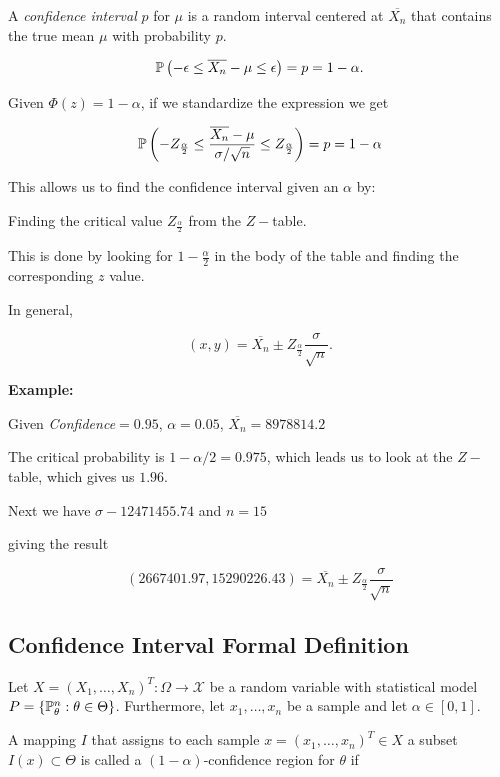 A \emph{confidence interval} \(p\) for \(\mu\) is a random interval centered at \(\overline{X_n}\) 
that contains the true mean \(\mu\) with probability \(p\). 

\[
    \mathbb{P}\left(- \epsilon \le  \overline{X_n} - \mu \le \epsilon\right) = p = 1 - \alpha.
\]

Given \(\Phi(z) = 1 - \alpha\), if we standardize the expression we get 

\[
    \mathbb{P}\left(- Z_{\frac{\alpha}{2}} \le  \frac{\overline{X_n} - \mu}{\sigma / \sqrt{n}} \le Z_{\frac{\alpha}{2}}\right) = p = 1 - \alpha
\]

This allows us to find the confidence interval given an \(\alpha\) by: 

Finding the critical value \(Z_{\frac{\alpha}{2}}\) from the \(Z-\)table.

This is done by looking for \(1 - \frac{\alpha}{2}\) in the body of the table and finding the corresponding \(z\) value.

In general, 

\[
    (x,y) = \overline{X_n} \pm Z_{\frac{\alpha}{2}} \frac{\sigma}{\sqrt{n}}.
\]

\textbf{Example:}

Given \emph{Confidence}\(= 0.95\), \(\alpha = 0.05\), \(\overline{X_n} = 8978814.2\)

The critical probability is \(1 - \alpha/2 = 0.975\), which leads us to look at the \(Z-\)table, which gives 
us \(1.96\). 

Next we have \(\sigma - 12471455.74\) and \(n = 15\)

giving the result 

\[
    (2667401.97, 15290226.43) = \overline{X_n} \pm Z_{\frac{\alpha}{2}} \frac{\sigma}{\sqrt{n}}
\]

\subsection{Confidence Interval Formal Definition}

Let \(X = (X_{1}, \ldots, X_{n})^{T} : \Omega \to \mathcal{X}\) be a random variable with statistical model \(P = \{ \mathbb{P}^{n}_{\theta} : \theta \in \Theta \}\).
Furthermore, let \(x_{1}, \ldots, x_{n}\) be a sample and let \(\alpha \in [0,1]\).

A mapping \(I\) that assigns to each sample \(x = (x_{1}, \ldots, x_{n})^{T} \in X\) a subset \(I(x) \subset \Theta\)
is called a \((1 - \alpha)\)-confidence region for \(\theta\) if

